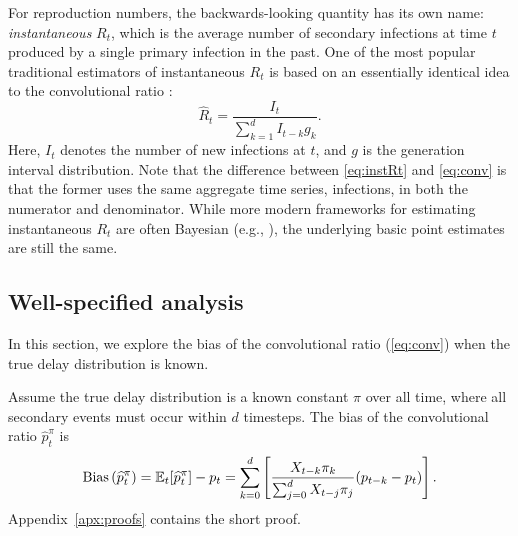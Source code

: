 \documentclass{article}
\renewcommand{\hat}{\widehat} %
\DeclareMathOperator{\bias}{Bias}
\newcommand{\djmcomment}[1]{{\color{teal}[DJM: #1]}}
\newcommand{\jmgcomment}[1]{{\color{cyan}[JMG: #1]}}
\begin{document}
For reproduction numbers, the backwards-looking quantity has its own name:
\emph{instantaneous} $R_t$, which is the average number of secondary infections
at time $t$ produced by a single primary infection in the past. One of the most
popular traditional estimators of instantaneous $R_t$ is based on an essentially 
identical idea to the convolutional ratio \citep{fraser2007, wallinga2007how}: 
\begin{equation}
\label{eq:instRt}
\hat{R}_t = \frac{I_t}{\sum_{k=1}^d I_{t-k} g_k}.
\end{equation}
Here, $I_t$ denotes the number of new infections at $t$, and $g$ is the
generation interval distribution. Note that the difference between
\eqref{eq:instRt} and \eqref{eq:conv} is that the former uses the same aggregate
time series, infections, in both the numerator and denominator. While more
modern frameworks for estimating instantaneous $R_t$ are often Bayesian (e.g.,
\citealp{cori2013new}), the underlying basic point estimates are still the same.

\subsection{Well-specified analysis}\label{sec:ws_analysis}

In this section, we explore the bias of the convolutional ratio (\ref{eq:conv}) when the true delay distribution is known.

\begin{proposition}\label{thm:OracleBias}
    Assume the true delay distribution is a known constant $\pi$ over all time, where all secondary events must occur within $d$ timesteps. 
    The bias of the convolutional ratio $\hat{p}_t^\pi$ is
\begin{equation*}
    \bias\left(\hat{p}_t^\pi\right) = \E_t[\hat{p}_t^\pi] - p_t = \sum_{k=0}^d \left[ \frac{X_{t-k}\pi_k}{\sum_{j=0}^d X_{t-j}\pi_j} (p_{t-k}-p_t) \right].
\end{equation*}
Appendix~\ref{apx:proofs} contains the short proof.
\end{proposition}
\end{document}
